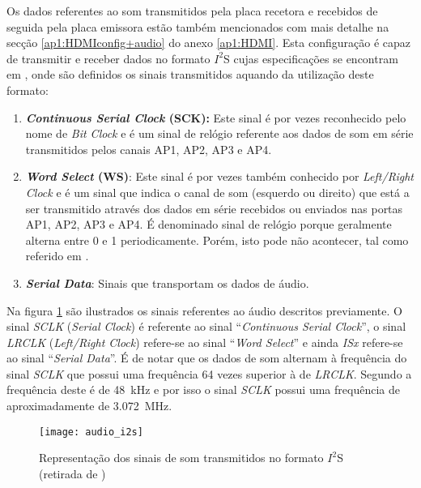 Os dados referentes ao som transmitidos pela placa recetora e recebidos de seguida pela placa emissora estão também mencionados com mais detalhe na secção \ref{ap1:HDMIconfig+audio} do anexo \ref{ap1:HDMI}. Esta configuração é capaz de transmitir e receber dados no formato $I^{2}$S cujas especificações se encontram em \cite{R027}, onde são definidos os sinais transmitidos aquando da utilização deste formato:

\begin{enumerate}
	\item \textbf{\textit{Continuous Serial Clock} (SCK):} Este sinal é por vezes reconhecido pelo nome de \textit{Bit Clock} e é um sinal de relógio referente aos dados de som em série transmitidos pelos canais AP1, AP2, AP3 e AP4.
	
	\item \textbf{\textit{Word Select} (WS)}: Este sinal é por vezes também conhecido por \textit{Left/Right Clock} e é um sinal que indica o canal de som (esquerdo ou direito) que está a ser transmitido através dos dados em série recebidos ou enviados nas portas AP1, AP2, AP3 e AP4. É denominado sinal de relógio porque geralmente alterna entre 0 e 1 periodicamente. Porém, isto pode não acontecer, tal como referido em \cite{R027}. 
	
	\item \textbf{\textit{Serial Data}}: Sinais que transportam os dados de áudio.

\end{enumerate}

Na figura \ref{fig:i2s_audio} são ilustrados os sinais referentes ao áudio descritos previamente. O sinal \textit{SCLK} (\textit{Serial Clock}) é referente ao sinal ``\textit{Continuous Serial Clock}'', o sinal \textit{LRCLK} (\textit{Left/Right Clock}) refere-se ao sinal ``\textit{Word Select}'' e ainda \textit{ISx }refere-se ao sinal ``\textit{Serial Data}''. É de notar que os dados de som alternam à frequência do sinal \textit{SCLK} que possui uma frequência 64 vezes superior à de \textit{LRCLK}. Segundo \cite{R014} a frequência deste é de \SI{48}{\kilo\hertz} e por isso o sinal \textit{SCLK} possui uma frequência de aproximadamente de  \SI{3.072}{\mega\hertz}.

\begin{figure}[h!]
	\begin{center}
		\leavevmode
		\texttt{[image: audio\_i2s]}
		\caption[IRepresentação dos sinais de som transmitidos no formato $I^{2}$S]{Representação dos sinais de som transmitidos no formato $I^{2}$S (retirada de \cite{R016})}
		\label{fig:i2s_audio}
	\end{center}
\end{figure}

